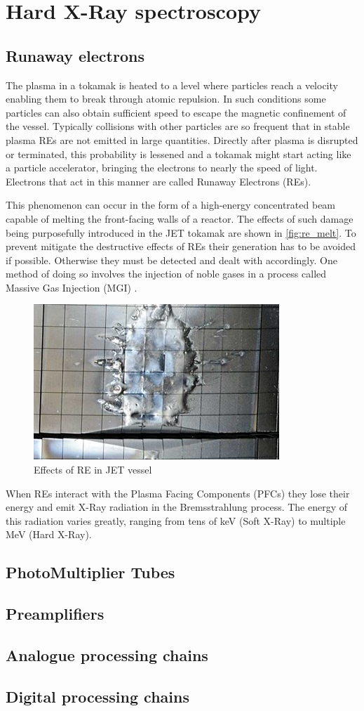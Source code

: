 \section{Hard X-Ray spectroscopy}
\subsection{Runaway electrons}
The plasma in a tokamak is heated to a level where particles reach a velocity
enabling them to break through atomic repulsion. In such conditions some 
particles can also obtain sufficient speed to escape the magnetic confinement
of the vessel. Typically collisions with other particles are so frequent
that in stable plasma REs are not emitted in large quantities.
Directly after plasma is disrupted or terminated, this probability is 
lessened and a tokamak might start acting like a particle accelerator,
bringing the electrons to nearly the speed of light.
Electrons that act in this manner are called Runaway Electrons (REs).
\cite{iter_re_melt}

This phenomenon can occur in the form of a high-energy 
concentrated beam capable of melting the front-facing walls of a reactor.
The effects of such damage being purposefully introduced in the JET tokamak
are shown in \autoref{fig:re_melt}. To prevent mitigate the destructive
effects of REs their generation has to be avoided if possible. Otherwise
they must be detected and dealt with accordingly. One method of doing so 
involves the injection of noble gases in a process called 
Massive Gas Injection (MGI) \cite{massive_gas_injection}.
 
\begin{figure}
  \centering
  \includegraphics[width=.7\linewidth]{media/re_melt.jpeg}
  \caption{Effects of RE in JET vessel\cite{iter_re_melt}}
  \label{fig:re_melt}
\end{figure}

When REs interact with the Plasma Facing Components (PFCs)
they lose their energy and emit X-Ray radiation in 
the Bremsstrahlung process. The energy of this radiation
varies greatly, ranging from tens of keV (Soft X-Ray)
to multiple MeV (Hard X-Ray).
\cite{hxrm_jet}


\subsection{PhotoMultiplier Tubes}
\subsection{Preamplifiers}
\subsection{Analogue processing chains}
\subsection{Digital processing chains}
